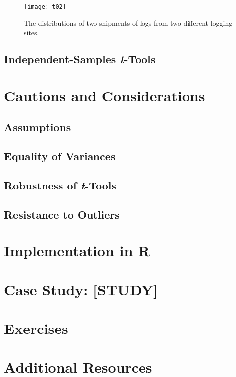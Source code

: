 \begin{figure}[h]
\texttt{[image: t02]}
\label{fig:t02}
\caption{The distributions of two shipments of logs from two different logging sites.}
\end{figure}

\subsection{Independent-Samples \textit{t}-Tools}

\section{Cautions and Considerations}

\subsection{Assumptions}

\subsection{Equality of Variances}

\subsection{Robustness of \textit{t}-Tools}

\subsection{Resistance to Outliers}

\section{Implementation in R}

\section{Case Study: [STUDY]}

\section{Exercises}

\section{Additional Resources}
